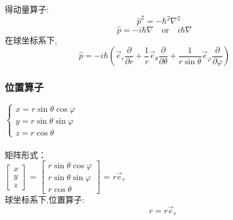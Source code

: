 \begin{frame}
	得动量算子: 
	\[ \hspace{1em}\hat{p}^2 =-\hbar ^2 \nabla ^{2}
		\]
	\[ \hat{p} =-i\hbar \nabla \quad \text{or} \quad i\hbar \nabla\]
	在球坐标系下,
	\[ \hat{p} =-i\hbar  ( \vec{e}_{r} \frac{\partial}{\partial r}+\frac{1}{r} \vec{e}_{\theta} \frac{\partial}{\partial \theta}+\frac{1}{r \sin \theta} \vec{e}_{\varphi} \frac{\partial}{\partial \varphi})
		\]
\end{frame}		

\begin{frame}
	\frametitle{位置算子 }	
	$\begin{cases}
		x= r\sin \theta \cos \varphi \\
		y= r\sin \theta \sin \varphi \\
		z=r\cos \theta
	\end{cases} $\\ 
	~~\\
	矩阵形式： \\ \vspace{0.6em}
	$
	\left[\begin{array}{ccc}
		x \\
		y \\
		z
	\end{array}\right]$
	=
	$\left[\begin{array}{ccc}
		r\sin \theta \cos \varphi  \\
		r\sin \theta \sin \varphi  \\
		r\cos \theta
	\end{array}\right]$	
	=
	$r \vec{e}_r$ \\ \vspace{0.3cm}
	球坐标系下,位置算子:
	\[ \qquad \hat{r}=r \vec{e}_r \]
\end{frame}	

